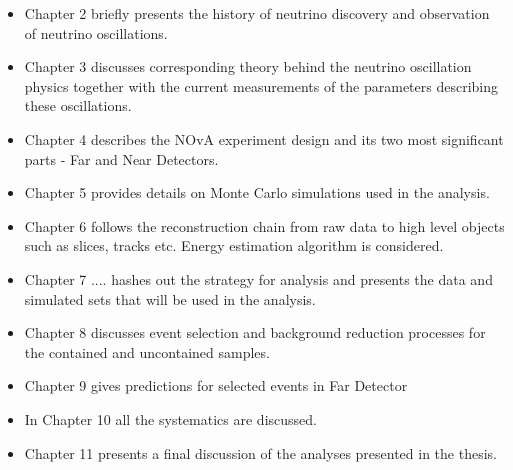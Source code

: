 \begin{itemize}

\item Chapter 2 briefly presents the history of neutrino discovery and observation 
of neutrino oscillations.

\item Chapter 3 discusses corresponding theory behind the neutrino oscillation physics
together with the current measurements of the parameters describing these oscillations.

\item Chapter 4 describes the NOvA experiment design and its two most significant parts -
Far and Near Detectors.

\item Chapter 5 provides details on Monte Carlo simulations used in the analysis.

\item Chapter 6 follows the reconstruction chain from raw data to high level objects 
such as slices, tracks etc. Energy estimation algorithm is considered.

\item Chapter 7 ....  hashes out the strategy for analysis and presents the data and
simulated sets that will be used in the analysis.

\item Chapter 8 discusses event selection and background reduction processes for the 
contained and uncontained samples.

\item Chapter 9 gives predictions for selected events in Far Detector

\item In Chapter 10 all the systematics are discussed.

\item Chapter 11 presents a final discussion of the analyses presented in the
thesis.

\end{itemize}

